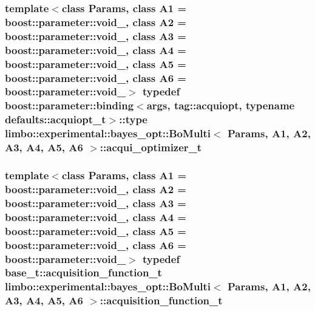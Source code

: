 \subsubsection[{acqui\+\_\+optimizer\+\_\+t}]{\setlength{\rightskip}{0pt plus 5cm}template$<$class Params, class A1 = boost\+::parameter\+::void\+\_\+, class A2 = boost\+::parameter\+::void\+\_\+, class A3 = boost\+::parameter\+::void\+\_\+, class A4 = boost\+::parameter\+::void\+\_\+, class A5 = boost\+::parameter\+::void\+\_\+, class A6 = boost\+::parameter\+::void\+\_\+$>$ typedef boost\+::parameter\+::binding$<${\bf args}, tag\+::acquiopt, typename {\bf defaults\+::acquiopt\+\_\+t}$>$\+::type {\bf limbo\+::experimental\+::bayes\+\_\+opt\+::\+Bo\+Multi}$<$ Params, A1, A2, A3, A4, A5, A6 $>$\+::{\bf acqui\+\_\+optimizer\+\_\+t}}\label{classlimbo_1_1experimental_1_1bayes__opt_1_1_bo_multi_aeea7e1ae62b3116ea392b098c40a1676}
\hypertarget{classlimbo_1_1experimental_1_1bayes__opt_1_1_bo_multi_af5c8c4b0a4912c1efa5e0156a83b06ab}{}
\subsubsection[{acquisition\+\_\+function\+\_\+t}]{\setlength{\rightskip}{0pt plus 5cm}template$<$class Params, class A1 = boost\+::parameter\+::void\+\_\+, class A2 = boost\+::parameter\+::void\+\_\+, class A3 = boost\+::parameter\+::void\+\_\+, class A4 = boost\+::parameter\+::void\+\_\+, class A5 = boost\+::parameter\+::void\+\_\+, class A6 = boost\+::parameter\+::void\+\_\+$>$ typedef {\bf base\+\_\+t\+::acquisition\+\_\+function\+\_\+t} {\bf limbo\+::experimental\+::bayes\+\_\+opt\+::\+Bo\+Multi}$<$ Params, A1, A2, A3, A4, A5, A6 $>$\+::{\bf acquisition\+\_\+function\+\_\+t}}\label{classlimbo_1_1experimental_1_1bayes__opt_1_1_bo_multi_af5c8c4b0a4912c1efa5e0156a83b06ab}
\hypertarget{classlimbo_1_1experimental_1_1bayes__opt_1_1_bo_multi_afbec2602c4a22ad0a1285cc813a51c58}{}
